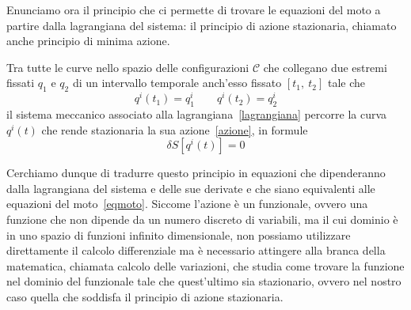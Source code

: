     Enunciamo ora il principio che ci permette di trovare le equazioni del moto a partire dalla lagrangiana del sistema: il principio di azione stazionaria, chiamato anche principio di minima azione.

    \begin{principle}
        Tra tutte le curve nello spazio delle configurazioni $\mathcal C$ che collegano due estremi fissati $q_1$ e $q_2$ di un intervallo temporale anch'esso fissato $[t_1, ~t_2]$ tale che 
    \begin{equation*}
        q^i(t_1) = q^i_1 \qquad q^i(t_2) = q^i_2
    \end{equation*}
        il sistema meccanico associato alla lagrangiana~\eqref{lagrangiana} percorre la curva $q^i(t)$ che rende stazionaria la sua azione~\eqref{azione}, in formule
    \begin{equation} \label{azionestazionaria}
        \delta S [q^i(t)] = 0
    \end{equation}
    \end{principle}

    Cerchiamo dunque di tradurre questo principio in equazioni che dipenderanno dalla lagrangiana del sistema e delle sue derivate e che siano equivalenti alle equazioni del moto~\eqref{eqmoto}. Siccome l'azione è un funzionale, ovvero una funzione che non dipende da un numero discreto di variabili, ma il cui dominio è in uno spazio di funzioni infinito dimensionale, non possiamo utilizzare direttamente il calcolo differenziale ma è necessario attingere alla branca della matematica, chiamata calcolo delle variazioni, che studia come trovare la funzione nel dominio del funzionale tale che quest'ultimo sia stazionario, ovvero nel nostro caso quella che soddisfa il principio di azione stazionaria. 
    
